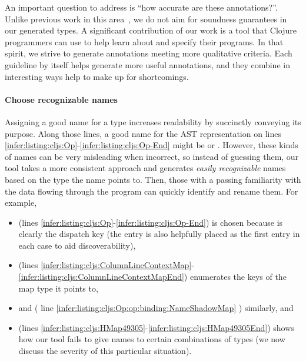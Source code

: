 
An important question to address is ``how accurate are these annotations?''.
Unlike previous work in this area~, we do not aim for soundness guarantees
in our generated types. 
A significant contribution of our work is a tool that Clojure programmers
can use to help learn about and specify their programs.
In that spirit, we strive to generate annotations meeting more qualitative criteria.
Each guideline by itself helps generate more useful annotations, and
they combine in interesting ways help to make up for shortcomings.

\paragraph{Choose recognizable names}
Assigning a good name for a type increases
readability by succinctly conveying its purpose.
Along those lines, a good name for the AST representation
on lines \ref{infer:listing:cljs:Op}-\ref{infer:listing:cljs:Op-End}
might be  or .
However, these kinds of names can be very misleading when incorrect, so
instead of guessing them,
our tool takes a more consistent approach and generates \emph{easily recognizable}
names based on the type the name points to.
Then, those with a passing familiarity with the data flowing through the program
can quickly identify and rename them.
For example,
\begin{itemize}
  \item
     (lines \ref{infer:listing:cljs:Op}-\ref{infer:listing:cljs:Op-End})
    is chosen because  is
    clearly the dispatch key (the  entry is also helpfully placed
    as the first entry in each case to aid discoverability),
  \item
     (lines \ref{infer:listing:cljs:ColumnLineContextMap}-\ref{infer:listing:cljs:ColumnLineContextMapEnd})
    enumerates the keys of the map type it points to,
  \item
     and  (%
    line
    \ref{infer:listing:cljs:Op:op:binding:NameShadowMap}%
    )
    similarly, and
  \item
     (lines \ref{infer:listing:cljs:HMap49305}-\ref{infer:listing:cljs:HMap49305End})
    shows how our tool fails to give names to certain combinations
    of types (we now discuss the severity of this particular situation).
\end{itemize}

